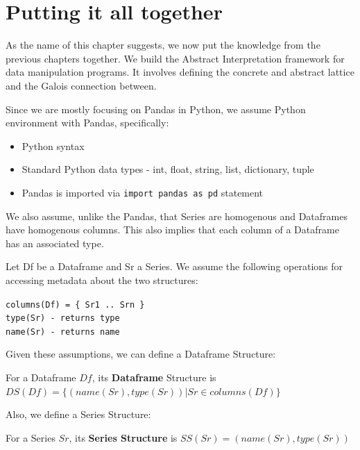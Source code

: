 \chapter{Putting it all together}\label{ch:putting-it-all-together}

As the name of this chapter suggests, we now put the knowledge from the previous chapters together.
We build the Abstract Interpretation framework for data manipulation programs.
It involves defining the concrete and abstract lattice and the Galois connection between.

Since we are mostly focusing on Pandas in Python, we assume Python environment with Pandas, specifically:

\begin{itemize}
    \item Python syntax
    \item Standard Python data types - int, float, string, list, dictionary, tuple
    \item Pandas is imported via \verb|import pandas as pd| statement
\end{itemize}

We also assume, unlike the Pandas, that Series are homogenous and Dataframes have homogenous columns.
This also implies that each column of a Dataframe has an associated type.

\begin{defn}
    Let Df be a Dataframe and Sr a Series.
    We assume the following operations for accessing metadata about the two structures:

    \verb|columns(Df) = { Sr1 .. Srn }| \\

    \verb|type(Sr) - returns type| \\

    \verb|name(Sr) - returns name| \\
\end{defn}

Given these assumptions, we can define a Dataframe Structure:

\begin{defn}
    For a Dataframe $Df$, its \textbf{Dataframe} Structure is $DS(Df) = \{ (name(Sr), type(Sr)) | Sr \in columns(Df) \}$
\end{defn}

Also, we define a Series Structure:

\begin{defn}
    For a Series $Sr$, its \textbf{Series Structure} is $SS(Sr) = (name(Sr), type(Sr))$
\end{defn}


